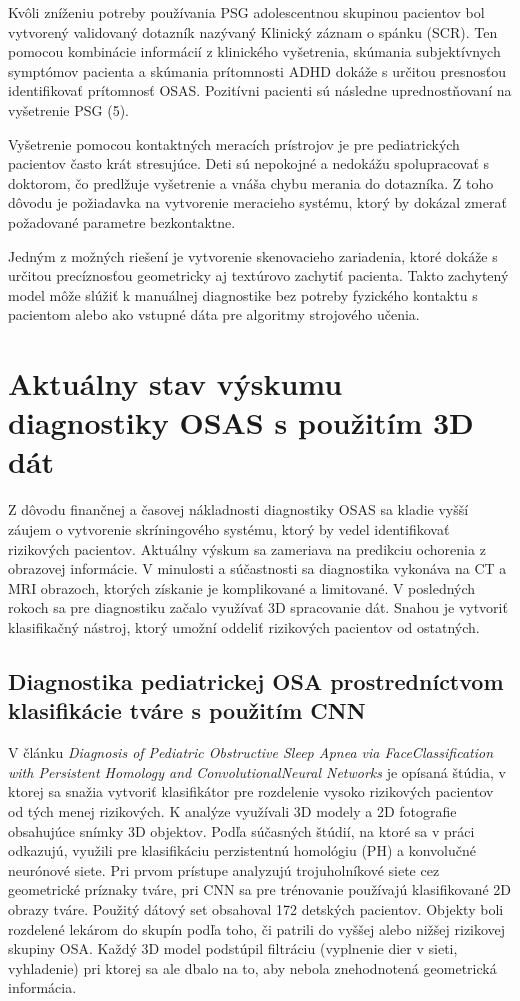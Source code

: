 Kvôli zníženiu potreby používania PSG adolescentnou skupinou pacientov bol vytvorený
validovaný dotazník nazývaný Klinický záznam o spánku (SCR). Ten pomocou kombinácie
informácií z klinického vyšetrenia, skúmania subjektívnych symptómov pacienta a skúmania
prítomnosti ADHD dokáže s určitou presnosťou identifikovať prítomnosť OSAS. Pozitívni
pacienti sú následne uprednostňovaní na vyšetrenie PSG (5).

Vyšetrenie pomocou kontaktných meracích prístrojov je pre pediatrických pacientov často krát
stresujúce. Deti sú nepokojné a nedokážu spolupracovať s doktorom, čo predlžuje vyšetrenie a
vnáša chybu merania do dotazníka. Z toho dôvodu je požiadavka na vytvorenie meracieho
systému, ktorý by dokázal zmerať požadované parametre bezkontaktne.

Jedným z možných riešení je vytvorenie skenovacieho zariadenia, ktoré dokáže s určitou
precíznosťou geometricky aj textúrovo zachytiť pacienta. Takto zachytený model môže slúžiť k manuálnej diagnostike bez potreby fyzického kontaktu s pacientom alebo ako vstupné dáta pre algoritmy strojového učenia.

\section{Aktuálny stav výskumu diagnostiky OSAS s použitím 3D dát}

Z dôvodu finančnej a časovej nákladnosti diagnostiky OSAS sa kladie vyšší záujem o vytvorenie skríningového systému, ktorý by vedel identifikovať rizikových pacientov. Aktuálny výskum sa zameriava na predikciu ochorenia z obrazovej informácie. V minulosti a súčastnosti sa diagnostika vykonáva na CT a MRI obrazoch, ktorých získanie je komplikované a limitované. V posledných rokoch sa pre diagnostiku začalo využívať 3D spracovanie dát. Snahou je vytvoriť klasifikačný nástroj, ktorý umožní oddeliť rizikových pacientov od ostatných. 

\newpage
\subsection{Diagnostika pediatrickej OSA prostredníctvom klasifikácie tváre s použitím CNN}

V článku \textit{Diagnosis of Pediatric Obstructive Sleep Apnea via FaceClassification with Persistent Homology and ConvolutionalNeural Networks} je opísaná štúdia, v ktorej sa snažia vytvoriť klasifikátor pre rozdelenie vysoko rizikových pacientov od tých menej rizikových. K analýze využívali 3D modely a 2D fotografie obsahujúce snímky 3D objektov. Podľa súčasných štúdií, na ktoré sa v práci odkazujú, využili pre klasifikáciu perzistentnú homológiu (PH) a konvolučné neurónové siete. Pri prvom prístupe analyzujú trojuholníkové siete cez geometrické príznaky tváre, pri CNN sa pre trénovanie používajú klasifikované 2D obrazy tváre. Použitý dátový set obsahoval 172 detských pacientov. Objekty boli rozdelené lekárom do skupín podľa toho, či patrili do vyššej alebo nižšej rizikovej skupiny OSA. Každý 3D model podstúpil filtráciu (vyplnenie dier v sieti, vyhladenie) pri ktorej sa ale dbalo na to, aby nebola znehodnotená geometrická informácia. 

